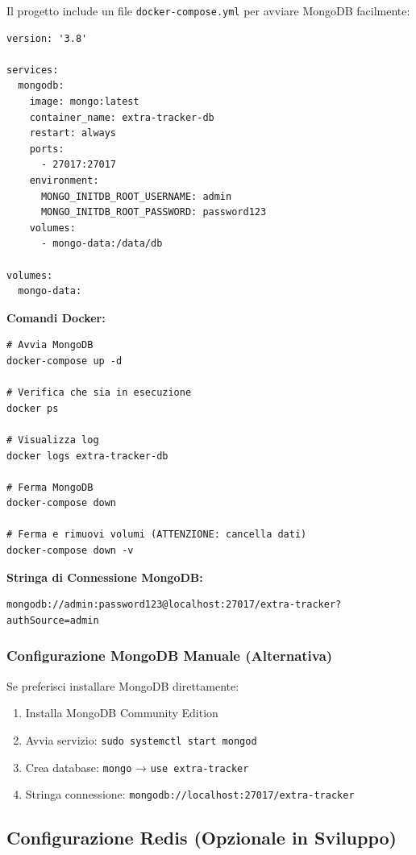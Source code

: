 \documentclass[11pt,a4paper]{article}
\newcommand{\code}[1]{\texttt{#1}}
\begin{document}
Il progetto include un file \code{docker-compose.yml} per avviare MongoDB facilmente:

\begin{lstlisting}[caption=docker-compose.yml]
version: '3.8'

services:
  mongodb:
    image: mongo:latest
    container_name: extra-tracker-db
    restart: always
    ports:
      - 27017:27017
    environment:
      MONGO_INITDB_ROOT_USERNAME: admin
      MONGO_INITDB_ROOT_PASSWORD: password123
    volumes:
      - mongo-data:/data/db

volumes:
  mongo-data:
\end{lstlisting}

\textbf{Comandi Docker:}

\begin{lstlisting}[caption=Comandi Docker]
# Avvia MongoDB
docker-compose up -d

# Verifica che sia in esecuzione
docker ps

# Visualizza log
docker logs extra-tracker-db

# Ferma MongoDB
docker-compose down

# Ferma e rimuovi volumi (ATTENZIONE: cancella dati)
docker-compose down -v
\end{lstlisting}

\textbf{Stringa di Connessione MongoDB:}
\begin{lstlisting}
mongodb://admin:password123@localhost:27017/extra-tracker?authSource=admin
\end{lstlisting}

\subsubsection{Configurazione MongoDB Manuale (Alternativa)}

Se preferisci installare MongoDB direttamente:

\begin{enumerate}
    \item Installa MongoDB Community Edition
    \item Avvia servizio: \code{sudo systemctl start mongod}
    \item Crea database: \code{mongo} → \code{use extra-tracker}
    \item Stringa connessione: \code{mongodb://localhost:27017/extra-tracker}
\end{enumerate}

\subsection{Configurazione Redis (Opzionale in Sviluppo)}
\end{document}

